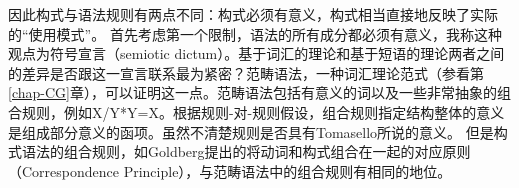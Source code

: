 \noindent 
因此构式与语法规则有两点不同：构式必须有意义，构式相当直接地反映了实际的“使用模式”。
首先考虑第一个限制，语法的所有成分都必须有意义，我称这种观点为符号宣言（semiotic dictum）。基于词汇的理论和基于短语的理论两者之间的差异是否跟这一宣言联系最为紧密？范畴语法，一种词汇理论范式（参看第\ref{chap-CG}章），可以证明这一点。范畴语法包括有意义的词以及一些非常抽象的组合规则，例如X/Y*Y=X。根据规则-对-规则假设，组合规则指定结构整体的意义是组成部分意义的函项。虽然不清楚规则是否具有Tomasello所说的意义。
但是构式语法的组合规则，如Goldberg提出的将动词和构式组合在一起的对应原则（Correspondence Principle）\citeyearpar[]{Goldberg95a}，与范畴语法中的组合规则有相同的地位。

